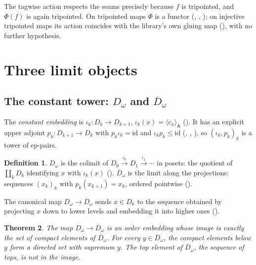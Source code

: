 \documentclass[11pt]{amsart}
\theoremstyle{plain}
\newtheorem{theorem}{Theorem}[section]
\theoremstyle{definition}
\newtheorem{definition}[theorem]{Definition}
\newcommand{\cst}[1]{c_{#1}}
\newcommand{\tg}[2]{\langle #1\rangle_{\mathsf{#2}}}
\newcommand{\Dc}{D_\omega}
\newcommand{\Db}{\overline{D}_\omega}
\newcommand{\id}{\mathrm{id}}
\begin{document}
The tagwise action respects the seams precisely because $f$ is tripointed, and
$\Phi(f)$ is again tripointed. On tripointed maps $\Phi$ is a functor
(, ,
); on injective tripointed maps its action
coincides with the library's own gluing map
(), with no further hypothesis.

\section{Three limit objects}\label{sec:objects}

\subsection{The constant tower: \texorpdfstring{$\Dc$}{D-omega} and \texorpdfstring{$\Db$}{its bilimit}}

The \emph{constant embedding} is $\iota_k\colon D_k\to D_{k+1}$,
$\iota_k(x)=\tg{\cst x}A$ (). It has an
explicit upper adjoint $p_k\colon D_{k+1}\to D_k$ with $p_k\iota_k=\id$ and
$\iota_kp_k\le\id$ (,
,
), so $(\iota_k,p_k)_k$ is a tower of
ep-pairs.

\begin{definition}
$\Dc$ is the colimit of $D_0\xrightarrow{\iota_0}D_1\xrightarrow{\iota_1}\cdots$
in posets: the quotient of $\coprod_kD_k$ identifying $x$ with $\iota_k(x)$
(). $\Db$ is the limit along the projections:
sequences $(x_k)_k$ with $p_k(x_{k+1})=x_k$, ordered pointwise
().
\end{definition}

The canonical map $\Dc\to\Db$ sends $x\in D_k$ to the sequence obtained by
projecting $x$ down to lower levels and embedding it into higher ones
().

\begin{theorem}\label{thm:compacts}
The map $\Dc\to\Db$ is an order embedding whose image is exactly the set of
compact elements of $\Db$. For every $y\in\Db$, the compact elements below $y$
form a directed set with supremum $y$. The top element of $\Db$, the sequence of
tops, is not in the image.
\end{theorem}
\end{document}

